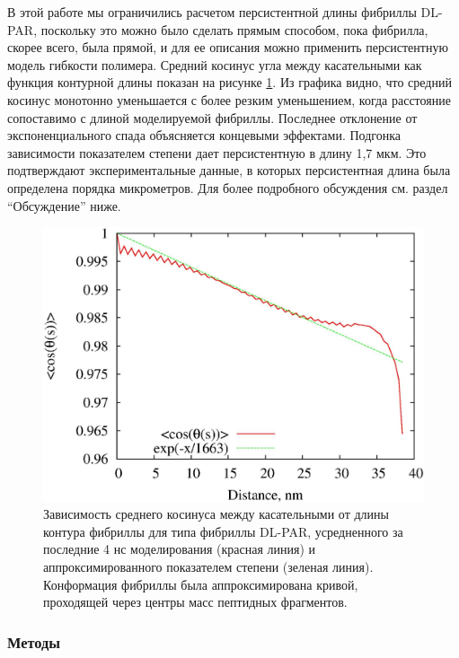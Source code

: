     В этой работе мы ограничились расчетом персистентной длины фибриллы DL-PAR, поскольку это можно было сделать прямым способом, пока фибрилла, скорее всего, была прямой, и для ее описания можно применить персистентную модель гибкости полимера. Средний косинус угла между касательными как функция контурной длины показан на рисунке \ref{fig:p4_p5_f47}. Из графика видно, что средний косинус монотонно уменьшается с более резким уменьшением, когда расстояние сопоставимо с длиной моделируемой фибриллы. Последнее отклонение от экспоненциального спада объясняется концевыми эффектами. Подгонка зависимости показателем степени дает персистентную в длину 1,7 мкм. Это подтверждают экспериментальные данные, в которых персистентная длина была определена порядка микрометров. Для более подробного обсуждения см. раздел ``Обсуждение'' ниже.

\begin{figure} [H]
    \centering
    \includegraphics[width=\textwidth]{images/p4/punkt5/part4_p5_f47.pdf}
    \caption[Зависимость среднего косинуса между касательными от длины контура фибриллы для типа фибриллы DL-PAR]{Зависимость среднего косинуса между касательными от длины контура фибриллы для типа фибриллы DL-PAR, усредненного за последние 4 нс моделирования (красная линия) и аппроксимированного показателем степени (зеленая линия). Конформация фибриллы была аппроксимирована кривой, проходящей через центры масс пептидных фрагментов.}
    \label{fig:p4_p5_f47}
\end{figure}



\subsubsection{Методы}

